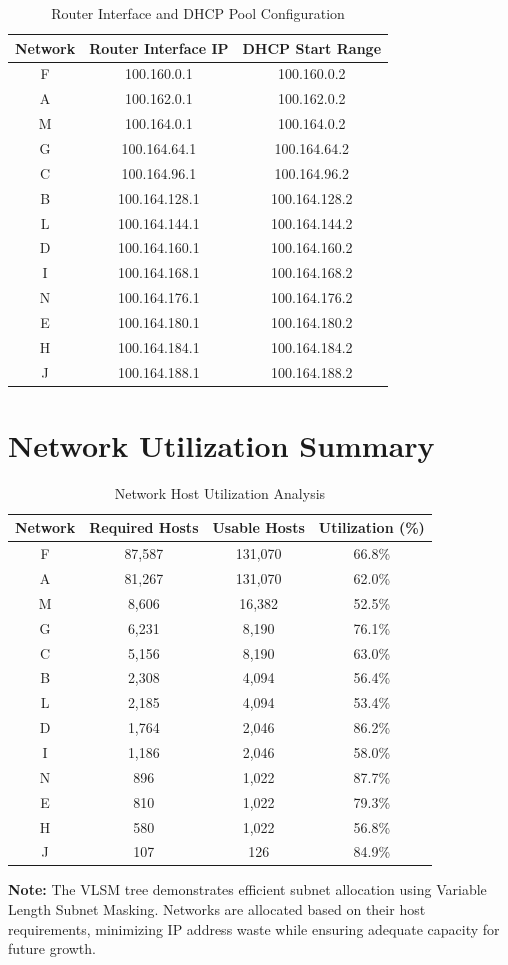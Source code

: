 \documentclass[12pt,a4paper]{article}
\begin{document}
\begin{table}[h]
\centering
\footnotesize
\begin{tabular}{|c|c|c|}
\hline
\textbf{Network} & \textbf{Router Interface IP} & \textbf{DHCP Start Range} \\
\hline
F & 100.160.0.1 & 100.160.0.2 \\
A & 100.162.0.1 & 100.162.0.2 \\
M & 100.164.0.1 & 100.164.0.2 \\
G & 100.164.64.1 & 100.164.64.2 \\
C & 100.164.96.1 & 100.164.96.2 \\
B & 100.164.128.1 & 100.164.128.2 \\
L & 100.164.144.1 & 100.164.144.2 \\
D & 100.164.160.1 & 100.164.160.2 \\
I & 100.164.168.1 & 100.164.168.2 \\
N & 100.164.176.1 & 100.164.176.2 \\
E & 100.164.180.1 & 100.164.180.2 \\
H & 100.164.184.1 & 100.164.184.2 \\
J & 100.164.188.1 & 100.164.188.2 \\
\hline
\end{tabular}
\caption{Router Interface and DHCP Pool Configuration}
\end{table}

\vspace{0.5cm}

\section*{Network Utilization Summary}

\begin{table}[h]
\centering
\footnotesize
\begin{tabular}{|c|c|c|c|}
\hline
\textbf{Network} & \textbf{Required Hosts} & \textbf{Usable Hosts} & \textbf{Utilization (\%)} \\
\hline
F & 87,587 & 131,070 & 66.8\% \\
A & 81,267 & 131,070 & 62.0\% \\
M & 8,606 & 16,382 & 52.5\% \\
G & 6,231 & 8,190 & 76.1\% \\
C & 5,156 & 8,190 & 63.0\% \\
B & 2,308 & 4,094 & 56.4\% \\
L & 2,185 & 4,094 & 53.4\% \\
D & 1,764 & 2,046 & 86.2\% \\
I & 1,186 & 2,046 & 58.0\% \\
N & 896 & 1,022 & 87.7\% \\
E & 810 & 1,022 & 79.3\% \\
H & 580 & 1,022 & 56.8\% \\
J & 107 & 126 & 84.9\% \\
\hline
\end{tabular}
\caption{Network Host Utilization Analysis}
\end{table}

\vspace{0.3cm}

\footnotesize
\textbf{Note:} The VLSM tree demonstrates efficient subnet allocation using Variable Length Subnet Masking. Networks are allocated based on their host requirements, minimizing IP address waste while ensuring adequate capacity for future growth.
\end{document}
